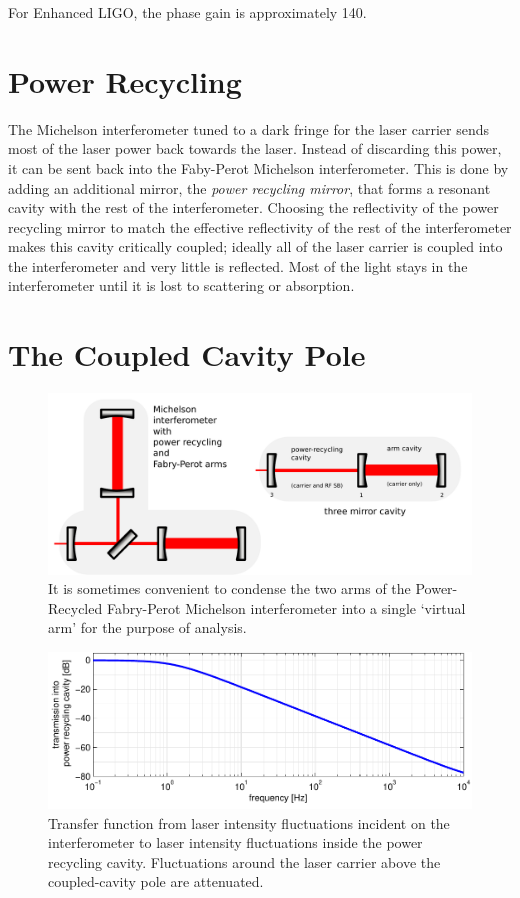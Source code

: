 For Enhanced LIGO, the phase gain is approximately 140.

\section{Power Recycling}

The Michelson interferometer tuned to a dark fringe for the laser
carrier sends most of the laser power back towards the laser.  Instead
of discarding this power, it can be sent back into the Faby-Perot
Michelson interferometer.  This is done by adding an additional
mirror, the \emph{power recycling mirror}, that forms a resonant
cavity with the rest of the interferometer.  Choosing the reflectivity
of the power recycling mirror to match the effective reflectivity of
the rest of the interferometer makes this cavity critically coupled;
ideally all of the laser carrier is coupled into the interferometer
and very little is reflected.  Most of the light stays in the
interferometer until it is lost to scattering or absorption.

\section{The Coupled Cavity Pole}

\begin{figure}
\includegraphics[width=\columnwidth]{figures/three-mirror-cavity.pdf}
\caption[Three mirror cavity]{It is sometimes convenient to condense the
two arms of the Power-Recycled Fabry-Perot Michelson interferometer into
a single `virtual arm' for the purpose of analysis.
\label{fig:three-mirror-cavity}}
\end{figure}

\begin{figure}
\includegraphics[width=\columnwidth]{figures/ccpole.pdf}
\caption[The coupled-cavity pole]{Transfer function from laser intensity
fluctuations incident on the interferometer to laser intensity fluctuations
inside the power recycling cavity.  Fluctuations around the laser carrier
above the coupled-cavity pole are attenuated.\label{fig:cctf}}
\end{figure}

